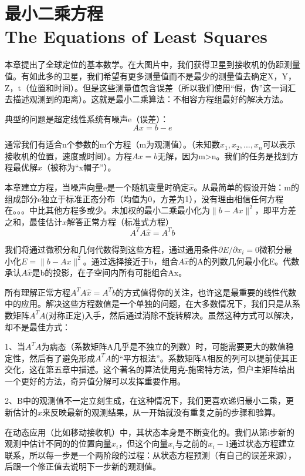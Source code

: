 \section[最小二乘方程]{最小二乘方程\\The Equations of Least Squares}
本章提出了全球定位的基本数学。在大图片中，我们获得卫星到接收机的伪距测量值。有如此多的卫星，我们希望有更多测量值而不是最少的测量值去确定X，Y，Z，t（位置和时间）。但是这些测量值包含误差（所以我们使用“假，伪”这一词汇去描述观测到的距离）。这就是最小二乘算法：不相容方程组最好的解决方法。

典型的问题是超定线性系统有噪声e（误差）：
\begin{equation}\label{eq:4.1}
Ax=b-e
\end{equation}

通常我们有适合n个参数的m个方程（m为观测值）。（未知数$x_1,x_2,...,x_n$可以表示接收机的位置，速度或时间）。方程$Ax=b$无解，因为m>n。我们的任务是找到方程最优解$\hat{x}$（被称为“x帽子”）。

本章建立方程，当噪声向量e是一个随机变量时确定$\hat{x}$。从最简单的假设开始：m的组成部分e独立于标准正态分布（均值为0，方差为1），没有理由相信任何方程在。。。中比其他方程多或少。未加权的最小二乘最小化为$\parallel b-Ax\parallel^2$，即平方差之和，最佳估计$\hat{x}$解答正常方程（标准式方程）
\begin{equation}\label{eq:4.2}
A^TA\hat{x}=A^Tb
\end{equation}	

我们将通过微积分和几何代数得到这些方程，通过通用条件$\partial E/\partial    x_i=0$微积分最小化$E=\|b-Ax\|^2$。通过选择接近于b，组合$A\hat{x}$的A的列数几何最小化E。代数承认$A\hat{x}$是b的投影，在子空间内所有可能组合Ax。

所有理解正常方程$A^TA\hat{x}=A^Tb$的方式值得你的关注，也许这是最重要的线性代数中的应用。解决这些方程数值是一个单独的问题，在大多数情况下，我们只是从系数矩阵$A^TA$(对称正定)入手，然后通过消除不旋转解决。虽然这种方式可以解决，却不是最佳方式：

1、当$A^TA$为病态（系数矩阵A几乎是不独立的列数）时，可能需要更大的数值稳定性，然后有了避免形成$A^TA$的“平方根法”。系数矩阵A相反的列可以提前使其正交化，这在第五章中描述。这个著名的算法使用克-施密特方法，但户主矩阵给出一个更好的方法，奇异值分解可以发挥重要作用。

2、B中的观测值不一定立刻生成，在这种情况下，我们更喜欢递归最小二乘，更新估计的$\hat{x}$来反映最新的观测结果，从一开始就没有重复之前的步骤和验算。

在动态应用（比如移动接收机）中，其状态本身是不断变化的。我们从第i步新的观测中估计不同的的位置向量$x_i$，但这个向量$x_i$与之前的$x_i-1$通过状态方程建立联系，所以每一步是一个两阶段的过程：从状态方程预测（有自己的误差来源），后跟一个修正值去说明下一步新的观测值。

